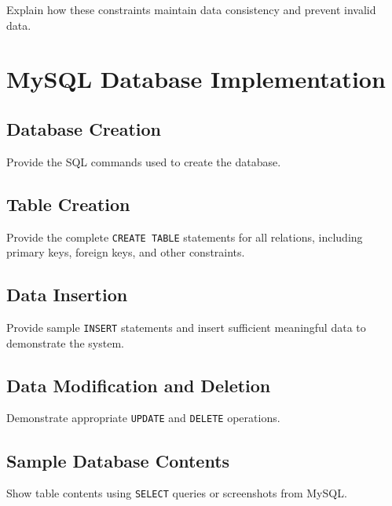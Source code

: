 \documentclass[12pt,a4paper]{report}
\begin{document}
Explain how these constraints maintain data consistency and prevent invalid data.

\chapter{MySQL Database Implementation}

\section{Database Creation}
Provide the SQL commands used to create the database.

\section{Table Creation}
Provide the complete \texttt{CREATE TABLE} statements for all relations, including primary keys, foreign keys, and other constraints.

\section{Data Insertion}
Provide sample \texttt{INSERT} statements and insert sufficient meaningful data to demonstrate the system.

\section{Data Modification and Deletion}
Demonstrate appropriate \texttt{UPDATE} and \texttt{DELETE} operations.

\section{Sample Database Contents}
Show table contents using \texttt{SELECT} queries or screenshots from MySQL.
\end{document}
